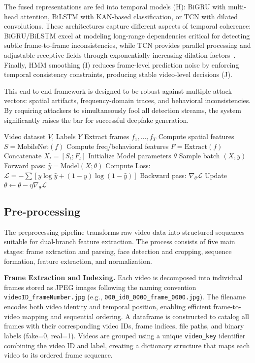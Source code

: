 \documentclass[conference]{IEEEtran}
\begin{document}
The fused representations are fed into temporal models (H): BiGRU with multi-head attention, BiLSTM with KAN-based classification, or TCN with dilated convolutions. These architectures capture different aspects of temporal coherence: BiGRU/BiLSTM excel at modeling long-range dependencies critical for detecting subtle frame-to-frame inconsistencies, while TCN provides parallel processing and adjustable receptive fields through exponentially increasing dilation factors~\cite{b5}. Finally, HMM smoothing (I) reduces frame-level prediction noise by enforcing temporal consistency constraints, producing stable video-level decisions (J).

This end-to-end framework is designed to be robust against multiple attack vectors: spatial artifacts, frequency-domain traces, and behavioral inconsistencies. By requiring attackers to simultaneously fool all detection streams, the system significantly raises the bar for successful deepfake generation.

\begin{algorithm}[H]
\caption{General Training Procedure}
\begin{algorithmic}[1]
\REQUIRE Video dataset $V$, Labels $Y$
    \STATE Extract frames $f_1, \dots, f_T$
    \STATE Compute spatial features $S = \text{MobileNet}(f)$
    \STATE Compute freq/behavioral features $F = \text{Extract}(f)$
    \STATE Concatenate $X_t = [S_t; F_t]$
\ENDFOR
\STATE Initialize Model parameters $\theta$
    \STATE Sample batch $(X, y)$
    \STATE Forward pass: $\hat{y} = \text{Model}(X; \theta)$
    \STATE Compute Loss: $\mathcal{L} = -\sum [y \log \hat{y} + (1-y) \log (1-\hat{y})]$
    \STATE Backward pass: $\nabla_\theta \mathcal{L}$
    \STATE Update $\theta \leftarrow \theta - \eta \nabla_\theta \mathcal{L}$
\ENDWHILE
\end{algorithmic}
\end{algorithm}
\subsection{Pre-processing}

The preprocessing pipeline transforms raw video data into structured sequences suitable for dual-branch feature extraction. The process consists of five main stages: frame extraction and parsing, face detection and cropping, sequence formation, feature extraction, and normalization.

\textbf{Frame Extraction and Indexing.} Each video is decomposed into individual frames stored as JPEG images following the naming convention \texttt{videoID\_frameNumber.jpg} (e.g., \texttt{000\_id0\_0000\_frame\_0000.jpg}). The filename encodes both video identity and temporal position, enabling efficient frame-to-video mapping and sequential ordering. A dataframe is constructed to catalog all frames with their corresponding video IDs, frame indices, file paths, and binary labels (fake=0, real=1). Videos are grouped using a unique \texttt{video\_key} identifier combining the video ID and label, creating a dictionary structure that maps each video to its ordered frame sequence.
\end{document}
